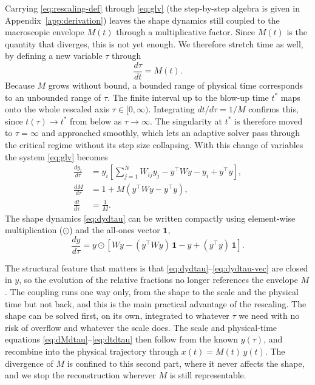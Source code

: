 Carrying \eqref{eq:rescaling-def} through \eqref{eq:glv} (the step-by-step
algebra is given in Appendix~\ref{app:derivation}) leaves the shape dynamics
still coupled to the macroscopic envelope $M(t)$ through a multiplicative
factor. Since $M(t)$ is the quantity that diverges, this is not yet
enough. We therefore stretch time as well, by defining a new variable
$\tau$ through
\begin{equation}
    \frac{d\tau}{dt} = M(t).
    \label{eq:time-rescaling}
\end{equation}
Because $M$ grows without bound, a bounded range of physical time corresponds to an
unbounded range of $\tau$. The finite interval up to the blow-up time $t^\ast$ maps
onto the whole rescaled axis $\tau \in [0,\infty)$. Integrating $dt/d\tau = 1/M$
confirms this, since $t(\tau) \to t^\ast$ from below as $\tau \to \infty$. The
singularity at $t^\ast$ is therefore moved to $\tau = \infty$ and approached
smoothly, which lets an adaptive solver pass through the critical regime without its
step size collapsing. With this change of variables the system
\eqref{eq:glv} becomes
\begin{align}
    \frac{dy_i}{d\tau} &= y_i \left[ \sum_{j=1}^N W_{ij} y_j - y^{\!\top} W y - y_i + y^{\!\top} y \right],
    \label{eq:dydtau} \\[4pt]
    \frac{dM}{d\tau}   &= 1 + M \left( y^{\!\top} W y - y^{\!\top} y \right),
    \label{eq:dMdtau} \\[4pt]
    \frac{dt}{d\tau}   &= \frac{1}{M}.
    \label{eq:dtdtau}
\end{align}
The shape dynamics \eqref{eq:dydtau} can be written compactly using
element-wise multiplication ($\odot$) and the all-ones vector $\mathbf{1}$,
\begin{equation}
    \frac{dy}{d\tau} = y \odot \left[ Wy - (y^{\!\top} W y)\,\mathbf{1} - y + (y^{\!\top} y)\,\mathbf{1} \right].
    \label{eq:dydtau-vec}
\end{equation}

The structural feature that matters is that \eqref{eq:dydtau}--\eqref{eq:dydtau-vec}
are closed in $y$, so the evolution of the relative fractions no longer references the
envelope $M$. The coupling runs one way only, from the shape to the scale and the
physical time but not back, and this is the main practical advantage of the
rescaling. The shape can be solved first, on its own, integrated to whatever $\tau$
we need with no risk of overflow and whatever the scale does. The scale and
physical-time equations \eqref{eq:dMdtau}--\eqref{eq:dtdtau} then follow from the
known $y(\tau)$, and recombine into the physical trajectory through
$x(t) = M(t)\,y(t)$. The divergence of $M$ is confined to this second part, where it never
affects the shape, and we stop the reconstruction wherever $M$ is still
representable.

